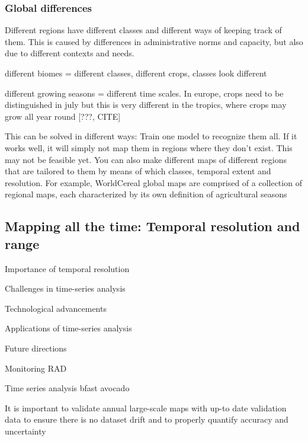         \subsubsection{Global differences}

        Different regions have different classes and different ways of keeping track of them. This is caused by differences in administrative norms and capacity, but also due to different contexts and needs.

        different biomes = different classes, different crops, classes look different
        
        different growing seasons = different time scales. In europe, crops need to be distinguished in july \citep{esch2014differentiation,xu2021towards} but this is very different in the tropics, where crops may grow all year round [???, CITE]
        
        This can be solved in different ways: Train one model to recognize them all. If it works well, it will simply not map them in regions where they don't exist. This may not be feasible yet. You can also make different maps of different regions that are tailored to them by means of which classes, temporal extent and resolution. For example, WorldCereal global maps are comprised of a collection of regional maps, each characterized by its own definition of agricultural seasons \citep{tricht2023worldcereal}

    \subsection{Mapping all the time: Temporal resolution and range}

        Importance of temporal resolution

        Challenges in time-series analysis

        Technological advancements

        Applications of time-series analysis

        Future directions

        Monitoring RAD
    
        Time series analysis bfast avocado
    
        \citep{masolele2024mapping}
    
        It is important to validate annual large-scale maps with up-to date validation data to ensure there is no dataset drift and to properly quantify accuracy and uncertainty \citep{tsendbazar2021towards}
    

